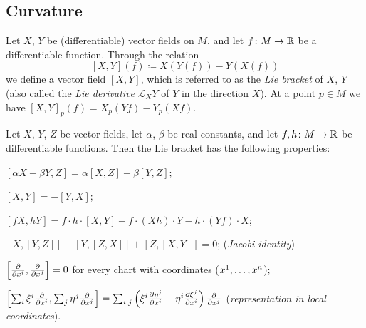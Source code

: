 \documentclass[../main.tex]{subfiles}
\begin{document}
\subsection{Curvature}
\begin{definition}\label{Manifold:LieBracket}
Let $X$, $Y$ be (differentiable) vector fields on $M$,
and let $f\colon M\to\mathbb{R}$ be a differentiable function.
Through the relation
\begin{equation*}
\left[X,Y\right]\left(f\right)
\coloneqq
X\left(Y\left(f\right)\right)
- Y\left(X\left(f\right)\right)
\end{equation*}
we define a vector field $\left[X,Y\right]$,
which is referred to as the \textit{Lie bracket} of $X$, $Y$
(also called the \textit{Lie derivative} $\mathcal{L}_XY$ of $Y$ in the direction $X$).
At a point $p\in M$ we have $\left[X,Y\right]_p\left(f\right)=X_p\left(Yf\right)-Y_p\left(Xf\right)$.
\end{definition}
\begin{lemma}\label{Manifold:LieBracket:Property}
Let $X$, $Y$, $Z$ be vector fields,
let $\alpha$, $\beta$ be real constants,
and let $f, h\colon M\to\mathbb{R}$ be differentiable functions.
Then the Lie bracket has the following properties:
\begin{APAenumerate}
\item $\left[\alpha X+\beta Y, Z\right]=\alpha\left[X,Z\right]+\beta\left[Y,Z\right]$;
\item $\left[X,Y\right]=-\left[Y,X\right]$;
\item $\left[fX,hY\right]=f\cdot h\cdot\left[X,Y\right]+f\cdot\left(Xh\right)\cdot Y-h\cdot\left(Yf\right)\cdot X$;
\item $\left[X,\left[Y,Z\right]\right]+\left[Y,\left[Z,X\right]\right]+\left[Z,\left[X,Y\right]\right] = 0$; (\textit{Jacobi identity})
\item $\left[\frac{\partial}{\partial\tensor{x}{^i}}, \frac{\partial}{\partial\tensor{x}{^j}}\right]=0$ for every chart with coordinates ($\tensor{x}{^1},\dots,\tensor{x}{^n}$);
\item $\left[\sum_i\tensor{\xi}{^i}\frac{\partial}{\partial\tensor{x}{^i}},\sum_j\tensor{\eta}{^j}\frac{\partial}{\partial\tensor{x}{^j}}\right]=\sum_{i,j}\left(\tensor{\xi}{^i}\frac{\partial\tensor{\eta}{^j}}{\partial\tensor{x}{^i}}-\tensor{\eta}{^i}\frac{\partial\tensor{\xi}{^j}}{\partial\tensor{x}{^i}}\right)\frac{\partial}{\partial\tensor{x}{^j}}$ (\textit{representation in local coordinates}).
\end{APAenumerate}
\end{lemma}
\end{document}
